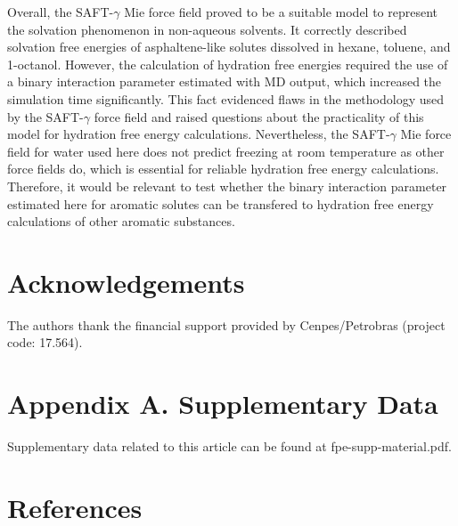 \documentclass[final,12p,times,twocolumn]{elsarticle}
\begin{document}
	Overall, the SAFT-$\gamma$ Mie force field proved to be a suitable model to represent the solvation phenomenon in non-aqueous solvents. It correctly described solvation free energies of asphaltene-like solutes dissolved in hexane, toluene, and 1-octanol. However, the calculation of hydration free energies required the use of a binary interaction parameter estimated with MD output, which increased the simulation time significantly. This fact evidenced flaws in the methodology used by the SAFT-$\gamma$ force field and raised questions about the practicality of this model for hydration free energy calculations. Nevertheless, the SAFT-$\gamma$ Mie force field for water used here does not predict freezing at room temperature as other force fields do, which is essential for reliable hydration free energy calculations.
	Therefore, it would be relevant to test whether the binary interaction parameter estimated here for aromatic solutes can be transfered to hydration free energy calculations of other aromatic substances.

	\section*{Acknowledgements}
	
	The authors thank the financial support provided by Cenpes/Petrobras (project code: 17.564). 
	
	\section*{Appendix A. Supplementary Data}

	Supplementary data related to this article can be found at fpe-supp-material.pdf.

	\section*{References}
	
	
	
\end{document}
